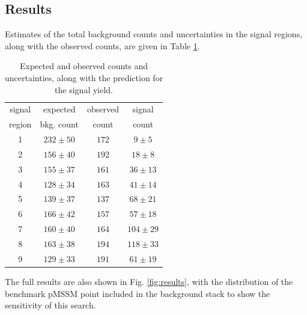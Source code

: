 \subsection{Results}
Estimates of the total background counts and uncertainties in the signal regions, along with the observed counts, are given in Table \ref{tab:results}.  
    \begin{table}[htb]
    \label{tab:preCMS}
    \centering
    \vspace{1ex}
    \begin{tabular}{c|c|c|c}
    \hline
    signal & expected    & observed  & signal  \\
    region & bkg. count    & count   & count  \\
    \hline\hline
1 & $232\pm50$ & $172$ & $9\pm5$\\
2 & $156\pm40$ & $192$ & $18\pm8$\\
3 & $155\pm37$ & $161$ & $36\pm13$\\
4 & $128\pm34$ & $163$ & $41\pm14$\\
5 & $139\pm37$ & $137$ & $68\pm21$\\
6 & $166\pm42$ & $157$ & $57\pm18$\\
7 & $160\pm40$ & $164$ & $104\pm29$\\
8 & $163\pm38$ & $194$ & $118\pm33$\\
9 & $129\pm33$ & $191$ & $61\pm19$\\
    \hline
    \end{tabular}
    \caption{Expected and observed counts and uncertainties, along with the prediction for the signal yield.}
        \label{tab:results}
    \end{table}
The full results are also shown in Fig. \ref{fig:results}, with the distribution of the benchmark pMSSM point included in the background stack to show the sensitivity of this search.

